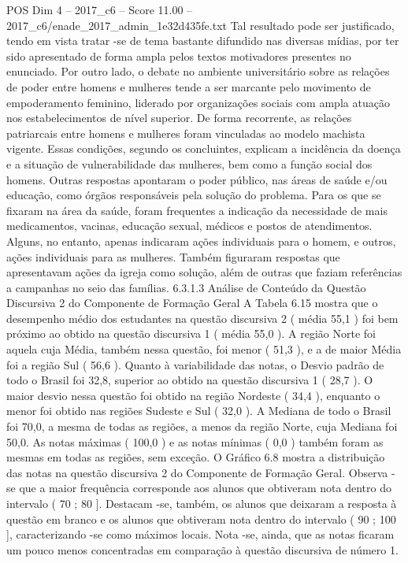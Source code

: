\begin{textsample}{POS Dim 4 – 2017\_c6 – Score 11.00 – 2017\_c6/enade\_2017\_admin\_1e32d435fe.txt}
Tal resultado pode ser justificado, tendo em vista tratar -se de tema bastante difundido nas diversas mídias, por ter sido apresentado de forma ampla pelos textos motivadores presentes no enunciado.
Por outro lado, o debate no ambiente universitário sobre as relações de poder entre homens e mulheres tende a ser marcante pelo movimento de empoderamento feminino, liderado por organizações sociais com ampla atuação nos estabelecimentos de nível superior.
De forma recorrente, as relações patriarcais entre homens e mulheres foram vinculadas ao modelo machista vigente.
Essas condições, segundo os concluintes, explicam a incidência da doença e a situação de vulnerabilidade das mulheres, bem como a função social dos homens.
Outras respostas apontaram o poder público, nas áreas de saúde e/ou educação, como órgãos responsáveis pela solução do problema.
Para os que se fixaram na área da saúde, foram frequentes a indicação da necessidade de mais medicamentos, vacinas, educação sexual, médicos e postos de atendimentos.
Alguns, no entanto, apenas indicaram ações individuais para o homem, e outros, ações individuais para as mulheres.
Também figuraram respostas que apresentavam ações da igreja como solução, além de outras que faziam referências a campanhas no seio das famílias. 6.3.1.3 Análise de Conteúdo da Questão Discursiva 2 do Componente de Formação Geral A Tabela 6.15 mostra que o desempenho médio dos estudantes na questão discursiva 2 ( média 55,1 ) foi bem próximo ao obtido na questão discursiva 1 ( média 55,0 ).
A região Norte foi aquela cuja Média, também nessa questão, foi menor ( 51,3 ), e a de maior Média foi a região Sul ( 56,6 ).
Quanto à variabilidade das notas, o Desvio padrão de todo o Brasil foi 32,8, superior ao obtido na questão discursiva 1 ( 28,7 ).
O maior desvio nessa questão foi obtido na região Nordeste ( 34,4 ), enquanto o menor foi obtido nas regiões Sudeste e Sul ( 32,0 ).
A Mediana de todo o Brasil foi 70,0, a mesma de todas as regiões, a menos da região Norte, cuja Mediana foi 50,0.
As notas máximas ( 100,0 ) e as notas mínimas ( 0,0 ) também foram as mesmas em todas as regiões, sem exceção.
O Gráfico 6.8 mostra a distribuição das notas na questão discursiva 2 do Componente de Formação Geral.
Observa -se que a maior frequência corresponde aos alunos que obtiveram nota dentro do intervalo ( 70 ; 80 ].
Destacam -se, também, os alunos que deixaram a resposta à questão em branco e os alunos que obtiveram nota dentro do intervalo ( 90 ; 100 ], caracterizando -se como máximos locais.
Nota -se, ainda, que as notas ficaram um pouco menos concentradas em comparação à questão discursiva de número 1.

\end{textsample}

